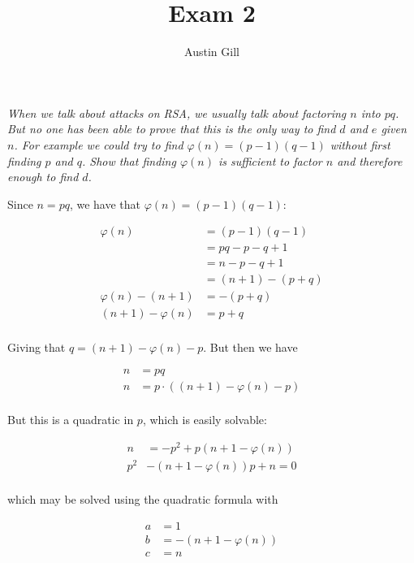 \documentclass[12pt]{article}
\title{Exam 2}
\author{Austin Gill}
\begin{document}
\maketitle

\section{} \textit{When we talk about attacks on RSA, we usually talk about factoring $n$ into $pq$. But no one has been able to prove that this is the only way to find $d$ and $e$ given $n$. For example we could try to find $\varphi(n) = (p-1)(q-1)$ without first finding $p$ and $q$. Show that finding $\varphi(n)$ is sufficient to factor $n$ and therefore enough to find $d$.}

    Since $n = pq$, we have that $\varphi(n) = (p - 1)(q - 1)$:

    \begin{align*}
        \varphi(n) &= (p - 1)(q - 1)\\
                   &= pq - p - q + 1\\
                   &= n - p - q + 1\\
                   &= (n + 1) - (p + q)\\
        \varphi(n) - (n + 1) &= - (p + q)\\
        (n + 1) - \varphi(n) &= p + q\\
    \end{align*}

    Giving that $q = (n + 1) - \varphi(n) - p$. But then we have

    \begin{align*}
        n &= pq\\
        n &= p \cdot \left((n + 1) - \varphi(n) - p\right)\\
    \end{align*}

    But this is a quadratic in $p$, which is easily solvable:

    \begin{align*}
        n &= -p^2 + p(n + 1 - \varphi(n))\\
        p^2 &- (n + 1 - \varphi(n))p + n = 0\\
    \end{align*}

    which may be solved using the quadratic formula with

    \begin{align*}
        a &= 1\\
        b &= -(n + 1 - \varphi(n))\\
        c &= n\\
    \end{align*}
\end{document}
